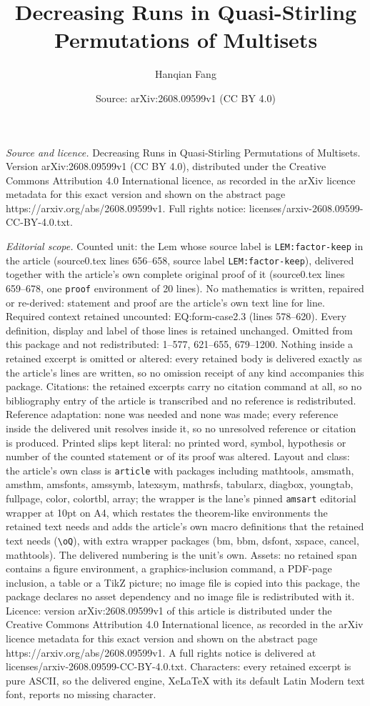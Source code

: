 \documentclass[10pt,a4paper]{amsart}
\title[Decreasing Runs in Quasi-Stirling Permutations of Multisets]{Decreasing Runs in Quasi-Stirling Permutations of Multisets}
\author{Hanqian Fang}
\date{Source: arXiv:2608.09599v1 (CC BY 4.0)}
\begin{document}
\maketitle

\noindent\emph{Source and licence.} Decreasing Runs in Quasi-Stirling Permutations of Multisets. Version arXiv:2608.09599v1 (CC BY 4.0), distributed under the Creative Commons Attribution 4.0 International licence, as recorded in the arXiv licence metadata for this exact version and shown on the abstract page https://arxiv.org/abs/2608.09599v1. Full rights notice: licenses/arxiv-2608.09599-CC-BY-4.0.txt.\par\smallskip

\noindent\textit{Editorial scope.} Counted unit: the Lem whose source label is \texttt{LEM:factor-keep} in the article (source0.tex lines 656--658, source label \texttt{LEM:factor-keep}), delivered together with the article's own complete original proof of it (source0.tex lines 659--678, one \texttt{proof} environment of 20 lines). No mathematics is written, repaired or re-derived: statement and proof are the article's own text line for line. Required context retained uncounted: EQ:form-case2.3 (lines 578--620). Every definition, display and label of those lines is retained unchanged. Omitted from this package and not redistributed: 1--577, 621--655, 679--1200. Nothing inside a retained excerpt is omitted or altered: every retained body is delivered exactly as the article's lines are written, so no omission receipt of any kind accompanies this package. Citations: the retained excerpts carry no citation command at all, so no bibliography entry of the article is transcribed and no reference is redistributed. Reference adaptation: none was needed and none was made; every reference inside the delivered unit resolves inside it, so no unresolved reference or citation is produced. Printed slips kept literal: no printed word, symbol, hypothesis or number of the counted statement or of its proof was altered. Layout and class: the article's own class is \texttt{article} with packages including mathtools, amsmath, amsthm, amsfonts, amssymb, latexsym, mathrsfs, tabularx, diagbox, youngtab, fullpage, color, colortbl, array; the wrapper is the lane's pinned \texttt{amsart} editorial wrapper at 10pt on A4, which restates the theorem-like environments the retained text needs and adds the article's own macro definitions that the retained text needs (\texttt{\textbackslash oQ}), with extra wrapper packages (bm, bbm, dsfont, xspace, cancel, mathtools). The delivered numbering is the unit's own. Assets: no retained span contains a figure environment, a graphics-inclusion command, a PDF-page inclusion, a table or a TikZ picture; no image file is copied into this package, the package declares no asset dependency and no image file is redistributed with it. Licence: version arXiv:2608.09599v1 of this article is distributed under the Creative Commons Attribution 4.0 International licence, as recorded in the arXiv licence metadata for this exact version and shown on the abstract page https://arxiv.org/abs/2608.09599v1. A full rights notice is delivered at licenses/arxiv-2608.09599-CC-BY-4.0.txt. Characters: every retained excerpt is pure ASCII, so the delivered engine, XeLaTeX with its default Latin Modern text font, reports no missing character.
\end{document}
